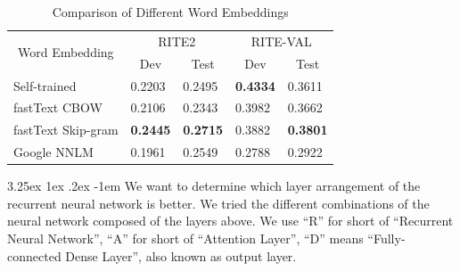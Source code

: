 \documentclass[12pt]{article}
\makeatletter
\renewcommand\paragraph{\@startsection{paragraph}{5}{\z@}%
  {3.25ex \@plus1ex \@minus.2ex}%
  {-1em}%
  {\normalfont\normalsize\bfseries}}
\makeatother
\begin{document}
\begin{CJK*}{UTF8}{bkai}
\begin{spacing}{1.77}
\begin{table}[H]
  \centering
  \setlength{\extrarowheight}{-3pt}
  \caption{Comparison of Different Word Embeddings}
  \label{result:nnlm_comparison}
  \begin{tabular}{|l|l|l|l|l|}
  \hline
  \multicolumn{1}{|c|}{\multirow{2}{*}{Word Embedding}} & \multicolumn{2}{c|}{RITE2} & \multicolumn{2}{c|}{RITE-VAL} \\ \cline{2-5}
  \multicolumn{1}{|c|}{} & \multicolumn{1}{c|}{Dev} & \multicolumn{1}{c|}{Test} & \multicolumn{1}{c|}{Dev} & \multicolumn{1}{c|}{Test} \\ \hline
  Self-trained & 0.2203 & 0.2495 & \textbf{0.4334} & 0.3611 \\ \hline
  fastText CBOW & 0.2106 & 0.2343 & 0.3982 & 0.3662 \\ \hline
  fastText Skip-gram & \textbf{0.2445} & \textbf{0.2715} & 0.3882 & \textbf{0.3801} \\ \hline
  Google NNLM & 0.1961 & 0.2549 & 0.2788 & 0.2922 \\ \hline
  \end{tabular}
\end{table}

\paragraph{}
We want to determine which layer arrangement of the recurrent neural network is better. We tried the different combinations of the neural network composed of the layers above. We use ``R'' for short of ``Recurrent Neural Network'', ``A'' for short of ``Attention Layer'', ``D'' means ``Fully-connected Dense Layer'', also known as output layer.


\end{spacing}
\end{CJK*}
\end{document}
